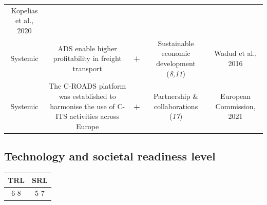 \documentclass[
]{book}
\begin{document}
\begin{longtable}[]{@{}ccccc@{}}
\begin{minipage}[t]{0.17\columnwidth}
Kopelias et al., 2020\strut
\end{minipage}\tabularnewline
\begin{minipage}[t]{0.17\columnwidth}\centering
Systemic\strut
\end{minipage} & \begin{minipage}[t]{0.16\columnwidth}\centering
ADS enable higher profitability in freight transport\strut
\end{minipage} & \begin{minipage}[t]{0.17\columnwidth}\centering
\textbf{+}\strut
\end{minipage} & \begin{minipage}[t]{0.17\columnwidth}\centering
Sustainable economic development (\emph{8,11})\strut
\end{minipage} & \begin{minipage}[t]{0.17\columnwidth}\centering
Wadud et al., 2016\strut
\end{minipage}\tabularnewline
\begin{minipage}[t]{0.17\columnwidth}\centering
Systemic\strut
\end{minipage} & \begin{minipage}[t]{0.16\columnwidth}\centering
The C-ROADS platform was established to harmonise the use of C-ITS activities across Europe\strut
\end{minipage} & \begin{minipage}[t]{0.17\columnwidth}\centering
\textbf{+}\strut
\end{minipage} & \begin{minipage}[t]{0.17\columnwidth}\centering
Partnership \& collaborations (\emph{17})\strut
\end{minipage} & \begin{minipage}[t]{0.17\columnwidth}\centering
European Commission, 2021\strut
\end{minipage}\tabularnewline
\bottomrule
\end{longtable}

\hypertarget{technology-and-societal-readiness-level-22}{%
\subsection*{Technology and societal readiness level}\label{technology-and-societal-readiness-level-22}}

\begin{longtable}[]{@{}cc@{}}
\toprule
TRL & SRL\tabularnewline
\midrule
\endhead
6-8 & 5-7\tabularnewline
\bottomrule
\end{longtable}
\end{document}
